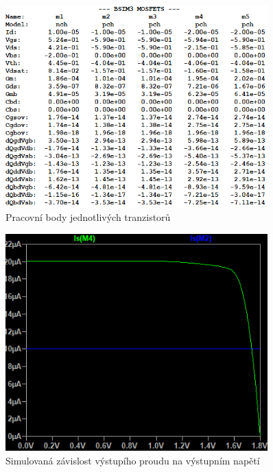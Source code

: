 \begin{figure}[h!]
    \centering
    \includegraphics[width=0.9\textwidth]{text/img/KPZ-op-OL.png}
    \caption{\label{fig:KPZ-op-OL} Pracovní body jednotlivých tranzistorů}
\end{figure}

\newpage

\begin{figure}[h!]
    \centering
    \includegraphics[width=0.9\textwidth]{text/img/KPZ-dc-graf.png}
    \caption{\label{fig:KPZ-dc-graf} Simulovaná závislost výstupího proudu na výstupním napětí}
\end{figure}

